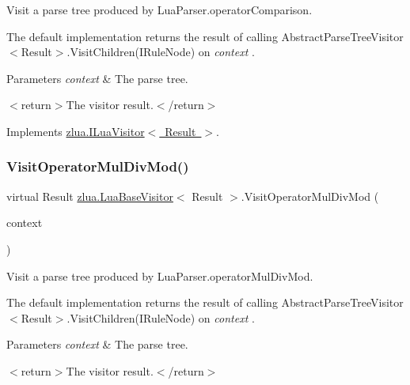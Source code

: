 Visit a parse tree produced by Lua\+Parser.\+operator\+Comparison. 

The default implementation returns the result of calling Abstract\+Parse\+Tree\+Visitor$<$\+Result$>$.\+Visit\+Children(\+I\+Rule\+Node) on {\itshape context} . 


\begin{DoxyParams}{Parameters}
{\em context} & The parse tree.\\
\hline
\end{DoxyParams}
$<$return$>$The visitor result.$<$/return$>$ 

Implements \mbox{\hyperlink{interfacezlua_1_1_i_lua_visitor_a981c3d7ed14831cde6805ea77ff4edeb}{zlua.\+I\+Lua\+Visitor$<$ Result $>$}}.

\mbox{\label{classzlua_1_1_lua_base_visitor_ac08ae206c958ce20c6774f14b31615f8}} 
\subsubsection{\texorpdfstring{Visit\+Operator\+Mul\+Div\+Mod()}{VisitOperatorMulDivMod()}}
{\footnotesize\ttfamily virtual Result \mbox{\hyperlink{classzlua_1_1_lua_base_visitor}{zlua.\+Lua\+Base\+Visitor}}$<$ Result $>$.Visit\+Operator\+Mul\+Div\+Mod (\begin{DoxyParamCaption}\item[{\mbox{[}\+Not\+Null\mbox{]} \mbox{\hyperlink{classzlua_1_1_lua_parser_1_1_operator_mul_div_mod_context}{Lua\+Parser.\+Operator\+Mul\+Div\+Mod\+Context}}}]{context }\end{DoxyParamCaption})\hspace{0.3cm}{\ttfamily [virtual]}}



Visit a parse tree produced by Lua\+Parser.\+operator\+Mul\+Div\+Mod. 

The default implementation returns the result of calling Abstract\+Parse\+Tree\+Visitor$<$\+Result$>$.\+Visit\+Children(\+I\+Rule\+Node) on {\itshape context} . 


\begin{DoxyParams}{Parameters}
{\em context} & The parse tree.\\
\hline
\end{DoxyParams}
$<$return$>$The visitor result.$<$/return$>$ 

